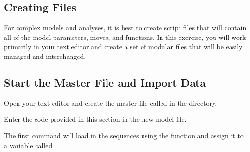 \bigskip

\subsection{Creating \Rev Files}

For complex models and analyses, it is best to create \Rev script files that will contain all of the model parameters, moves, and functions. 
In this exercise, you will work primarily in your text editor and create a set of modular files that will be easily managed and interchanged.

\bigskip
\subsection{Start the Master \Rev File and Import Data}\label{sect:StartMasterRev}

{\begin{framed}
Open your text editor and create the master \Rev file called {\textcolor{red}{}} in the  directory.

Enter the \Rev code provided in this section in the new model file.
\end{framed}}


%


The first command will load in the sequences using the  function and assign it to a variable called . 

